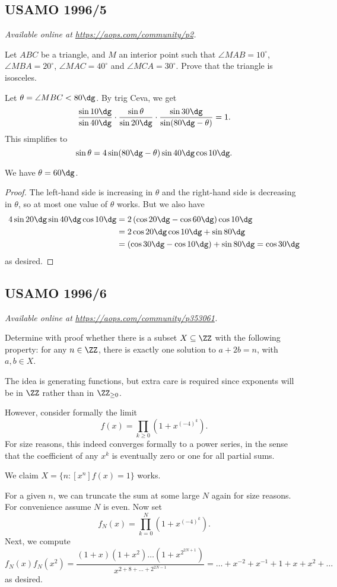 \documentclass[11pt]{scrartcl}
\begin{document}
\subsection{USAMO 1996/5}
\textsl{Available online at \url{https://aops.com/community/p2}.}
\begin{mdframed}[style=mdpurplebox,frametitle={Problem statement}]
Let $ABC$ be a triangle,
and $M$ an interior point such that
$\angle MAB=10^\circ$, $\angle MBA=20^\circ$,
$\angle MAC=40^\circ$ and $\angle MCA=30^\circ$.
Prove that the triangle is isosceles.
\end{mdframed}
Let $\theta = \angle MBC < 80\dg$.
By trig Ceva, we get
\[
  \frac{\sin 10\dg}{\sin 40\dg}
  \cdot
  \frac{\sin \theta}{\sin 20\dg}
  \cdot
  \frac{\sin 30\dg}{\sin (80\dg-\theta)}
  =
  1.
\]
This simplifies to
\[ \sin \theta = 4 \sin(80\dg- \theta) \sin 40\dg \cos 10\dg.\]
\begin{claim*}
  We have $\theta=60\dg$.
\end{claim*}
\begin{proof}
  The left-hand side is increasing in $\theta$ and the right-hand
  side is decreasing in $\theta$,
  so at most one value of $\theta$ works.
  But we also have
  \begin{align*}
    4\sin20\dg \sin40\dg \cos10\dg
    &= 2\left( \cos20\dg-\cos60\dg \right) \cos 10\dg \\
    &= 2\cos20\dg \cos 10\dg + \sin 80\dg \\
    &= (\cos 30\dg - \cos 10\dg) + \sin 80\dg = \cos 30\dg
  \end{align*}
  as desired.
\end{proof}
\pagebreak

\subsection{USAMO 1996/6}
\textsl{Available online at \url{https://aops.com/community/p353061}.}
\begin{mdframed}[style=mdpurplebox,frametitle={Problem statement}]
Determine with proof whether there is a subset $X \subseteq \ZZ$
with the following property: for any $n \in \ZZ$,
there is exactly one solution to $a+2b = n$, with $a,b \in X$.
\end{mdframed}
The idea is generating functions,
but extra care is required since exponents will be in $\ZZ$
rather than in $\ZZ_{\ge 0}$.

However, consider formally the limit
\[ f(x) = \prod_{k \ge 0} \left( 1 + x^{(-4)^k} \right). \]
For size reasons, this indeed converges formally to a power series,
in the sense that the coefficient of any $x^k$
is eventually zero or one for all partial sums.

We claim $X = \{ n : [x^n] f(x) = 1 \}$ works.

For a given $n$, we can truncate the sum at some large $N$
again for size reasons.
For convenience assume $N$ is even.
Now set
\[ f_N(x) = \prod_{k = 0}^N \left( 1 + x^{(-4)^k}  \right). \]
Next, we compute
\[
  f_N(x) f_N(x^2)
  = \frac{(1+x)(1+x^2) \dots ( 1+x^{2^{2N+1}} )}%
  {x^{2+8+\dots+2^{2N-1}}}
  = \dots + x^{-2} + x^{-1} + 1 + x + x^2 + \dots
\]
as desired.
\pagebreak
\end{document}
